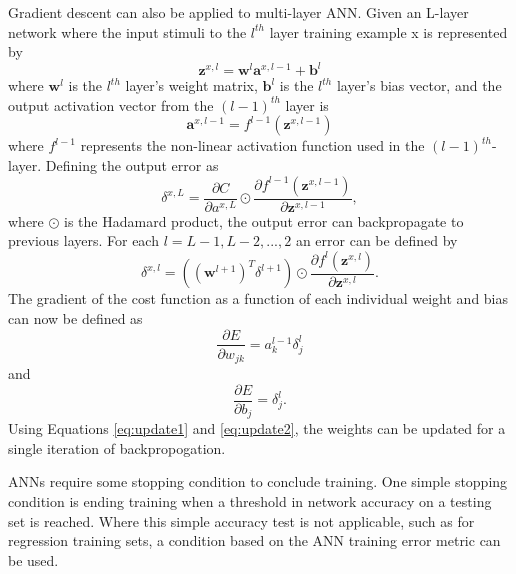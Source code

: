 Gradient descent can also be applied to multi-layer ANN. Given an L-layer network where the input stimuli to the $l^{th}$ layer training example x is represented by
%
\begin{equation} \label{eq:CrossEntropy}
\boldsymbol{z}^{x,l} = \boldsymbol{w}^{l}  \boldsymbol{a}^{x,l-1} + \boldsymbol{b}^{l}
\end{equation}
%
where $\boldsymbol{w}^{l}$ is the $l^{th}$ layer's weight matrix, $\boldsymbol{b}^{l}$ is the $l^{th}$ layer's bias vector, and the output activation vector from the $(l-1)^{th}$ layer is 
%
\begin{equation} \label{eq:CrossEntropy}
\boldsymbol{a}^{x,l-1} = f^{l-1}(\boldsymbol{z}^{x,l-1})
\end{equation}
%
where $f^{l-1}$ represents the non-linear activation function used in the $(l-1)^{th}$-layer. Defining the output error as 
%
\begin{equation} \label{eq:CrossEntropy}
\delta^{x,L} = \frac{\partial C}{\partial a^{x,L}} \odot \frac{\partial f^{l-1}(\boldsymbol{z}^{x,l-1}) }{\partial \boldsymbol{z}^{x,l-1}}, 
\end{equation}
%
where $\odot$ is the Hadamard product, the output error can backpropagate to previous layers. For each $l=L-1,L-2,...,2$ an error can be defined by
%
\begin{equation} \label{eq:CrossEntropy}
\delta^{x,l} = ((\boldsymbol{w}^{l+1})^T \delta^{l+1}) \odot \frac{\partial f^{l}(\boldsymbol{z}^{x,l}) }{\partial \boldsymbol{z}^{x,l}}.
\end{equation}
%
The gradient of the cost function as a function of each individual weight and bias can now be defined as 
%
\begin{equation} \label{eq:CrossEntropy1}
\frac{\partial E}{\partial w_{jk}} = a^{l-1}_k \delta^l_j
\end{equation}
%
and 
%
\begin{equation} \label{eq:CrossEntropy2}
\frac{\partial E}{\partial b_j} = \delta^l_j.
\end{equation}
%
Using Equations \ref{eq:update1} and \ref{eq:update2}, the weights can be updated for a single iteration of backpropogation. 

ANNs require some stopping condition to conclude training. One simple stopping condition is ending training when a threshold in network accuracy on a testing set is reached. Where this simple accuracy test is not applicable, such as for regression training sets, a condition based on the ANN training error metric can be used.

